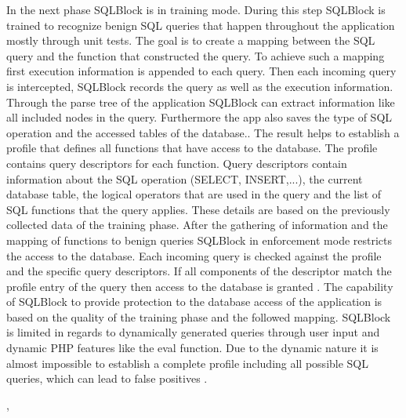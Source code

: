 In the next phase SQLBlock is in training mode. During this step SQLBlock is trained to recognize benign SQL queries that happen throughout the application mostly through unit tests. The goal is to create a mapping between the SQL query and the function that constructed the query. To achieve such a mapping first execution information is appended to each query. Then each incoming query is intercepted, SQLBlock records the query as well as the execution information. Through the parse tree of the application SQLBlock can extract information like all included nodes in the query. Furthermore the app also saves the type of SQL operation and the accessed tables of the database.\autocite[6]{Jahanshahi2018}. The result helps to establish a profile that defines all functions that have access to the database. The profile contains query descriptors for each function. Query descriptors contain information about the SQL operation (SELECT, INSERT,...), the current database table, the logical operators that are used in the query and the list of SQL functions that the query applies. These details are based on the previously collected data of the training phase. After the gathering of information and the mapping of functions to benign queries SQLBlock in enforcement mode restricts the access to the database. Each incoming query is checked against the profile and the specific query descriptors. If all components of the descriptor match the profile entry of the query then access to the database is granted \autocite[7]{Jahanshahi2018}. The capability of SQLBlock to provide protection to the database access of the application is based on the quality of the training phase and the followed mapping. SQLBlock is limited in regards to dynamically generated queries through user input and dynamic PHP features like the eval function. Due to the dynamic nature it is almost impossible to establish a complete profile including all possible SQL queries, which can lead to false positives \autocite[12]{Jahanshahi2018}.




\autocite[]{Lam2008}, \autocite[]{Hosek2011} 



